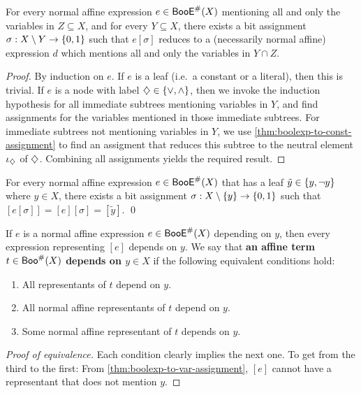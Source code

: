 \documentclass[a4paper]{memoir}
\begin{document}
\begin{lemma} \label{thm:boolexp-to-pruning-assignment}
	For every normal affine expression $e \in \mathsf{BooE}^\#(X)$ mentioning all and only the variables in $Z \subseteq X$, and for every $Y \subseteq X$, there exists a bit assignment $\sigma : X \setminus Y \to \mathopen{}\left\{ 0, 1 \right\}\mathclose{}$ such that $e[\sigma]$ reduces to a (necessarily normal affine) expression $d$ which mentions all and only the variables in $Y \cap Z$.
\end{lemma}
\begin{proof}
	By induction on $e$.
	If $e$ is a leaf (i.e.\ a constant or a literal), then this is trivial.
	If $e$ is a node with label $\mathbin{\diamondsuit} \in \mathopen{}\left\{ {\vee}, {\wedge} \right\}\mathclose{}$, then we invoke the induction hypothesis for all immediate subtrees mentioning variables in $Y$, and find assignments for the variables mentioned in those immediate subtrees.
	For immediate subtrees not mentioning variables in $Y$, we use \cref{thm:boolexp-to-const-assignment} to find an assigment that reduces this subtree to the neutral element $\iota_{\mathbin{\diamondsuit}}$ of $\mathbin{\diamondsuit}$.
	Combining all assignments yields the required result.
\end{proof}
\begin{corollary} \label{thm:boolexp-to-var-assignment}
	For every normal affine expression $e \in \mathsf{BooE}^\#(X)$ that has a leaf $\tilde y \in \mathopen{}\left\{ y,\lnot y \right\}\mathclose{}$ where $y \in X$, there exists a bit assignment $\sigma : X \setminus \mathopen{}\left\{ y \right\}\mathclose{} \to \mathopen{}\left\{ 0, 1 \right\}\mathclose{}$ such that $[e[\sigma]] = [e][\sigma] = [\tilde y]$. \qed
\end{corollary}
\begin{definitioncorollary} \label{thm:bool:term-dependencies}
	If $e$ is a normal affine expression $e \in \mathsf{BooE}^\#(X)$ depending on $y$, then every expression representing $[e]$ depends on $y$.
	We say that \textbf{an affine term $t \in \mathsf{Boo}^\#(X)$ depends on $y \in X$} if the following equivalent conditions hold:
	\begin{enumerate}
		\item All representants of $t$ depend on $y$.
		\item All normal affine representants of $t$ depend on $y$.
		\item Some normal affine representant of $t$ depends on $y$.
	\end{enumerate}
\end{definitioncorollary}
\begin{proof}[Proof of equivalence]
	Each condition clearly implies the next one. To get from the third to the first:
	From \cref{thm:boolexp-to-var-assignment}, $[e]$ cannot have a representant that does not mention $y$.
\end{proof}
\end{document}
